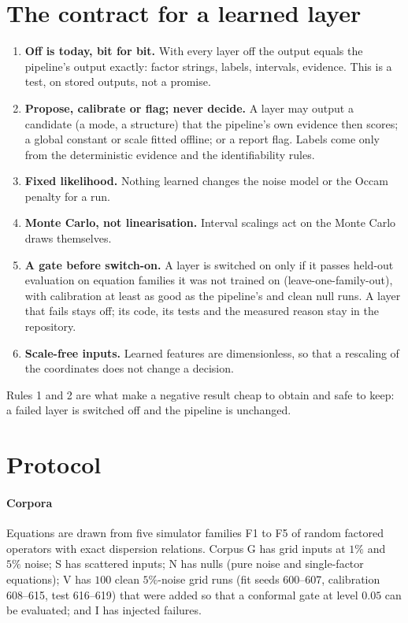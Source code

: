 \documentclass[11pt]{article}
\theoremstyle{plain}
\theoremstyle{definition}
\theoremstyle{remark}
\begin{document}
\section{The contract for a learned layer}\label{sec:contract}
\begin{enumerate}
\item \textbf{Off is today, bit for bit.} With every layer off the output equals the pipeline's output exactly: factor
  strings, labels, intervals, evidence. This is a test, on stored outputs, not a promise.
\item \textbf{Propose, calibrate or flag; never decide.} A layer may output a candidate (a mode, a structure) that the
  pipeline's own evidence then scores; a global constant or scale fitted offline; or a report flag. Labels come only from the
  deterministic evidence and the identifiability rules.
\item \textbf{Fixed likelihood.} Nothing learned changes the noise model or the Occam penalty for a run.
\item \textbf{Monte Carlo, not linearisation.} Interval scalings act on the Monte Carlo draws themselves.
\item \textbf{A gate before switch-on.} A layer is switched on only if it passes held-out evaluation on equation families it
  was not trained on (leave-one-family-out), with calibration at least as good as the pipeline's and clean null runs.
  A layer that fails stays off; its code, its tests and the measured reason stay in the repository.
\item \textbf{Scale-free inputs.} Learned features are dimensionless, so that a rescaling of the coordinates does not change a decision.
\end{enumerate}
Rules 1 and 2 are what make a negative result cheap to obtain and safe to keep: a failed layer is switched off and the
pipeline is unchanged.

\section{Protocol}\label{sec:protocol}
\paragraph{Corpora} Equations are drawn from five simulator families F1 to F5 of random factored operators with exact
dispersion relations. Corpus G has grid inputs at $1\%$ and $5\%$ noise; S has scattered inputs; N has nulls (pure noise and
single-factor equations); V has $100$ clean $5\%$-noise grid runs (fit seeds 600--607, calibration 608--615, test 616--619) that were
added so that a conformal gate at level $0.05$ can be evaluated; and I has injected failures.
\end{document}
